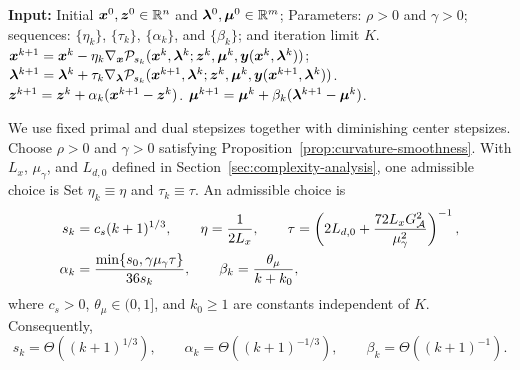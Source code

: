 \begin{algorithm}[t]
    \caption{Smoothed-Perturbed Linearized Augmented Lagrangian Method (SPLALM)}
    \label{alg:ddlalm}
    \small
    \begin{algorithmic}[1]
        \STATE \textbf{Input:} Initial
        \(\bm{x}^0,\bm{z}^0\in\mathbb{R}^n\) and
        \(\bm{\lambda}^0,\bm{\mu}^0\in\mathbb{R}^m\); 
        Parameters: \(\rho>0\) and \(\gamma>0\);
        sequences: \(\{\eta_k\}\), \(\{\tau_k\}\), \(\{\alpha_k\}\), and
        \(\{\beta_k\}\);
        and iteration limit \(K\).
            \STATE  \(\bm{x}^{k+1}=\bm{x}^k- \eta_k \nabla_{\bm{x}} \mathcal P_{s_k}(\bm{x}^{k}, \bm{\lambda}^{k}; \bm{z}^{k}, \bm{\mu}^{k}, \bm{y}(\bm{x}^k, \bm{\lambda}^k))\);
            \STATE  \(\bm{\lambda}^{k+1}=\bm{\lambda}^k+\tau_k
            \nabla_{\bm{\lambda}}\mathcal P_{s_k}
            (\bm{x}^{k+1},\bm{\lambda}^{k};\bm{z}^{k},\bm{\mu}^{k},
            \bm{y}(\bm{x}^{k+1},\bm{\lambda}^k))\).
            \STATE 
            \(\bm{z}^{k+1}=\bm{z}^k+ \alpha_k(\bm{x}^{k+1}-\bm{z}^k)\).
            \STATE  \(\bm{\mu}^{k+1}=\bm{\mu}^k+ \beta_k(\bm{\lambda}^{k+1}-\bm{\mu}^k)\).
        \ENDFOR
    \end{algorithmic}
\end{algorithm}

We use fixed primal and dual stepsizes together with diminishing center
stepsizes. Choose \(\rho>0\) and \(\gamma>0\) satisfying
Proposition~\ref{prop:curvature-smoothness}. With \(L_x\),
\(\mu_\gamma\), and \(L_{d,0}\) defined in
Section~\ref{sec:complexity-analysis}, one admissible choice is
Set $\eta_k\equiv\eta$ and $\tau_k\equiv\tau$. An admissible choice is
\begin{equation}\label{eq:ddlalm-parameter-schedule}
\begin{aligned}
    s_k &= c_s(k+1)^{1/3},
    \qquad
    \eta = \frac{1}{2L_x},
    \qquad
    \tau =
    \left(
        2L_{d,0}
        +\frac{72L_xG_{\cal A}^2}{\mu_\gamma^2}
    \right)^{-1},
    \\
    \alpha_k &=
    \frac{\min\{s_0,\gamma\mu_\gamma\tau\}}{36s_k},
    \qquad
    \beta_k=\frac{\theta_\mu}{k+k_0},
\end{aligned}
\end{equation}
where \(c_s>0\), \(\theta_\mu\in(0,1]\), and \(k_0\ge1\) are constants
independent of \(K\). Consequently,
\[
    s_k=\Theta((k+1)^{1/3}),
    \qquad
    \alpha_k=\Theta((k+1)^{-1/3}),
    \qquad
    \beta_k=\Theta((k+1)^{-1}).
\]

